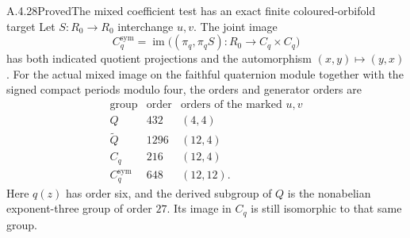 \begin{result}{A.4.28}{Proved}{The mixed coefficient test has an exact finite coloured-orbifold target}
Let $S:R_0\to R_0$ interchange $u,v$.  The joint image
\[
 C_q^{\mathrm{sym}}
    =\operatorname{im}\bigl((\pi_q,\pi_q S):
                          R_0\longrightarrow C_q\times C_q\bigr)
                                                               \tag{MCR.4}
\]
has both indicated quotient projections and the automorphism
$(x,y)\mapsto(y,x)$.  For the actual mixed image on the faithful
quaternion module together with the signed compact periods modulo
four, the orders and generator orders are
\[
\begin{array}{c|r|c}
\text{group}&\text{order}&\text{orders of the marked }u,v\\\hline
 Q&432&(4,4)\\
 \widetilde Q&1296&(12,4)\\
 C_q&216&(12,4)\\
 C_q^{\mathrm{sym}}&648&(12,12).
\end{array}                                                     \tag{MCR.5}
\]
Here $q(z)$ has order six, and the derived subgroup of $Q$ is
the nonabelian exponent-three group of order $27$.  Its image
in $C_q$ is still isomorphic to that same group.
\end{result}

